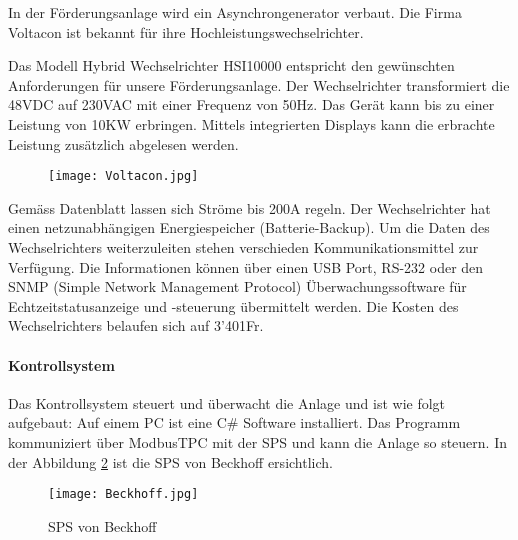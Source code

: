 In der Förderungsanlage wird ein Asynchrongenerator verbaut. Die Firma Voltacon ist bekannt für ihre Hochleistungswechselrichter.

Das Modell Hybrid Wechselrichter HSI10000 entspricht den gewünschten Anforderungen für unsere Förderungsanlage. Der Wechselrichter transformiert die 48VDC auf 230VAC mit einer Frequenz von 50\si{\hertz}. Das Gerät kann bis zu einer Leistung von 10KW erbringen. Mittels integrierten Displays kann die erbrachte Leistung zusätzlich abgelesen werden. 


\begin{figure} [H]
	\centering
	\texttt{[image: Voltacon.jpg]}
	\label{fig:Voltacon}
\end{figure}

Gemäss Datenblatt lassen sich Ströme bis 200A regeln. Der Wechselrichter hat einen netzunabhängigen Energiespeicher (Batterie-Backup). Um die Daten des Wechselrichters weiterzuleiten stehen verschieden Kommunikationsmittel zur Verfügung. Die Informationen können über einen USB Port, RS-232 oder den SNMP (Simple Network Management Protocol) Überwachungssoftware für Echtzeitstatusanzeige und -steuerung übermittelt werden. Die Kosten des Wechselrichters belaufen sich auf 3'401\si{Fr}.

\newpage


\paragraph{Kontrollsystem}

Das Kontrollsystem steuert und überwacht die Anlage und ist wie folgt aufgebaut: Auf einem PC ist eine C\# Software installiert. Das Programm kommuniziert über ModbusTPC mit der SPS und kann die Anlage so steuern. In der Abbildung \ref{fig:beckhoff}  ist die SPS von Beckhoff ersichtlich.

\bigskip

\begin{figure} [H]
	\centering
	\texttt{[image: Beckhoff.jpg]}
	\caption{SPS von Beckhoff \cite{beckhoff}}
	\label{fig:beckhoff}
\end{figure}

